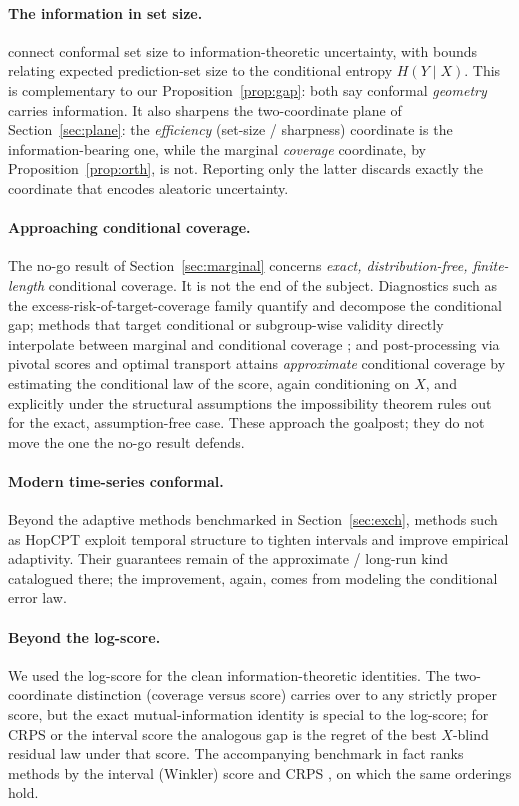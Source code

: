 \documentclass[10pt]{article} %
\theoremstyle{definition}
\begin{document}
\paragraph{The information in set size.}
\citet{correia2024information} connect conformal set size to information-theoretic
uncertainty, with bounds relating expected prediction-set size to the conditional entropy
$H(Y\mid X)$. This is complementary to our
Proposition~\ref{prop:gap}: both say conformal \emph{geometry} carries information. It also
sharpens the two-coordinate plane of Section~\ref{sec:plane}: the \emph{efficiency}
(set-size / sharpness) coordinate is the information-bearing one, while the marginal
\emph{coverage} coordinate, by Proposition~\ref{prop:orth}, is not. Reporting only the
latter discards exactly the coordinate that encodes aleatoric uncertainty.

\paragraph{Approaching conditional coverage.}
The no-go result of Section~\ref{sec:marginal} concerns \emph{exact, distribution-free,
finite-length} conditional coverage. It is not the end of the subject. Diagnostics such as
the excess-risk-of-target-coverage family \citep{braun2025conditional} quantify and
decompose the conditional gap; methods that target conditional or subgroup-wise validity
directly interpolate between marginal and conditional coverage \citep{gibbs2025conditional};
and post-processing via pivotal scores and optimal transport
\citep{laplante2026pivotal} attains \emph{approximate} conditional coverage by estimating
the conditional law of the score, again conditioning on $X$, and explicitly under the
structural assumptions the impossibility theorem rules out for the exact, assumption-free
case. These approach the goalpost; they do not move the one the no-go result defends.

\paragraph{Modern time-series conformal.}
Beyond the adaptive methods benchmarked in Section~\ref{sec:exch}, methods such as HopCPT
\citep{auer2023hopcpt} exploit temporal structure to tighten intervals and improve
empirical adaptivity. Their guarantees remain of the approximate / long-run kind catalogued
there; the improvement, again, comes from modeling the conditional error law.

\paragraph{Beyond the log-score.}
We used the log-score for the clean information-theoretic identities. The two-coordinate
distinction (coverage versus score) carries over to any strictly proper score, but the exact
mutual-information identity is special to the log-score; for CRPS or the interval score the
analogous gap is the regret of the best $X$-blind residual law under that score. The
accompanying benchmark in fact ranks methods by the interval (Winkler) score and CRPS
\citep{gneiting2007strictly}, on which the same orderings hold.
\end{document}
